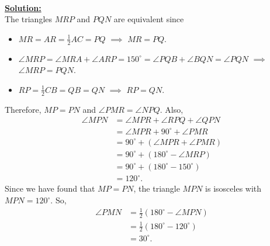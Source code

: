 \documentclass[a4paper]{article}
\begin{document}
\begin{enumerate}
\begin{figure}[htpb]
			\caption{}
			\label{fig:test_prob3-png}
		\end{figure}\\
		\underline{\textbf{Solution:}}\\
		The triangles $MRP$ and $PQN$ are equivalent since
		\begin{itemize}
			\item $MR = AR = \frac{1}{2} AC = PQ$ $\implies$ $MR = PQ$.
			\item $\angle MRP = \angle MRA + \angle ARP = 150^\circ
				= \angle PQB + \angle BQN = \angle PQN$ $\implies$ $\angle MRP = PQN$.
			\item $RP = \frac{1}{2}CB = QB = QN$ $\implies$ $RP = QN$.
		\end{itemize}
		Therefore, $MP = PN$ and $\angle PMR = \angle NPQ$.
		Also, 
		\begin{align*}
			\angle MPN &= \angle MPR + \angle RPQ + \angle QPN\\
			&= \angle MPR + 90^\circ + \angle PMR \\
			&= 90^\circ + (\angle MPR + \angle PMR) \\
			&= 90^\circ + (180^\circ - \angle MRP) \\
			&= 90^\circ + (180^\circ - 150^\circ) \\
			&= 120^\circ
		.\end{align*}
		Since we have found that $MP = PN$, the triangle $MPN$
		is isosceles with $MPN = 120^\circ$. So,  
		\begin{align*}
			\angle PMN &= \frac{1}{2}(180^\circ - \angle MPN)\\
				   &=  \frac{1}{2}(180^\circ - 120^\circ) \\
				   &= 30^\circ
		.\end{align*}
\end{enumerate}
\end{document}
